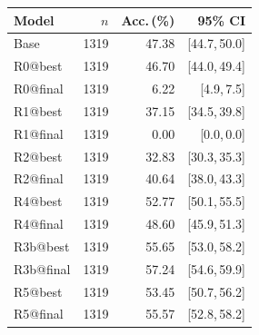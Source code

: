 \begin{tabular}{lrrr}
\toprule
Model & $n$ & Acc.\,(\%) & 95\% CI \\
\midrule
Base & 1319 & 47.38 & [44.7,\,50.0] \\
R0@best & 1319 & 46.70 & [44.0,\,49.4] \\
R0@final & 1319 & 6.22 & [4.9,\,7.5] \\
R1@best & 1319 & 37.15 & [34.5,\,39.8] \\
R1@final & 1319 & 0.00 & [0.0,\,0.0] \\
R2@best & 1319 & 32.83 & [30.3,\,35.3] \\
R2@final & 1319 & 40.64 & [38.0,\,43.3] \\
R4@best & 1319 & 52.77 & [50.1,\,55.5] \\
R4@final & 1319 & 48.60 & [45.9,\,51.3] \\
R3b@best & 1319 & 55.65 & [53.0,\,58.2] \\
R3b@final & 1319 & 57.24 & [54.6,\,59.9] \\
R5@best & 1319 & 53.45 & [50.7,\,56.2] \\
R5@final & 1319 & 55.57 & [52.8,\,58.2] \\
\bottomrule
\end{tabular}